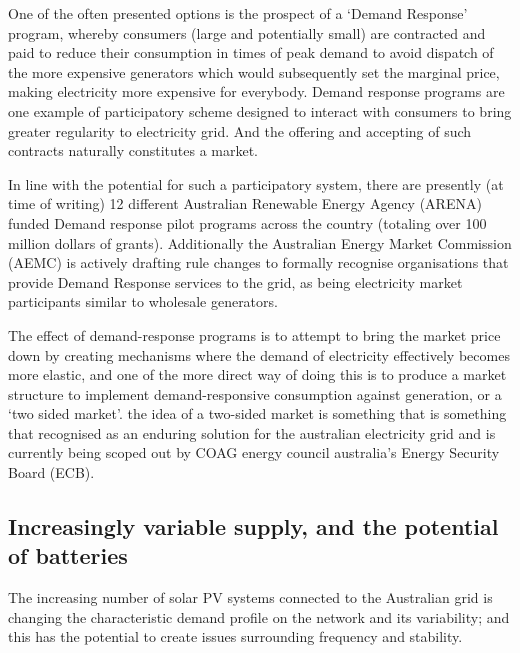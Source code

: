 One of the often presented options is the prospect of a `Demand Response' program, whereby consumers (large and potentially small) are contracted and paid to reduce their consumption in times of peak demand to avoid dispatch of the more expensive generators which would subsequently set the marginal price, making electricity more expensive for everybody.
Demand response programs are one example of participatory scheme designed to interact with consumers to bring greater regularity to electricity grid. And the offering and accepting of such contracts naturally constitutes a market.

In line with the potential for such a participatory system, there are presently (at time of writing) 12 different Australian Renewable Energy Agency (ARENA) funded Demand response pilot programs across the country (totaling over 100 million dollars of grants).
Additionally the Australian Energy Market Commission (AEMC) is actively drafting rule changes to formally recognise organisations that provide Demand Response services to the grid, as being electricity market participants similar to wholesale generators.\cite{australianenergymarketcommission2020}

The effect of demand-response programs is to attempt to bring the market price down by creating mechanisms where the demand of electricity effectively becomes more elastic, and one of the more direct way of doing this is to produce a market structure to implement demand-responsive consumption against generation, or a `two sided market'.
the idea of a two-sided market is something that is something that recognised as an enduring solution for the australian electricity grid \cite{australianenergymarketcommission2020} and is currently being scoped out by COAG energy council australia's Energy Security Board (ECB).\cite{energysecurityboard2020}

\subsection{Increasingly variable supply, and the potential of batteries}

The increasing number of solar PV systems connected to the Australian grid is changing the characteristic demand profile on the network and its variability; and this has the potential to create issues surrounding frequency and stability.


